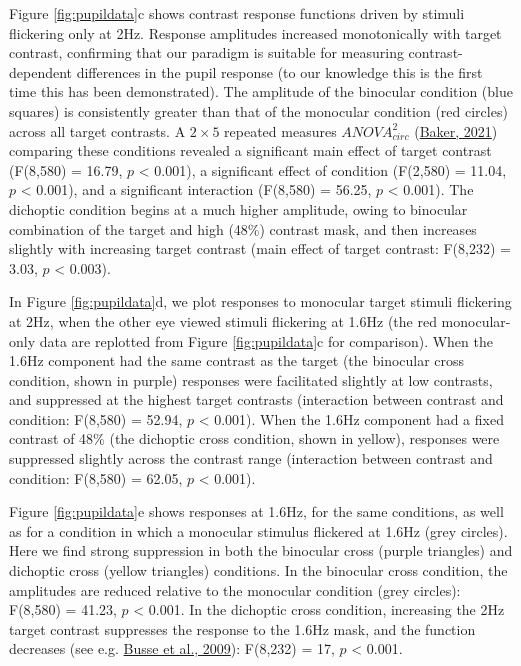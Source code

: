 \documentclass[
]{article}
\begin{document}
Figure \ref{fig:pupildata}c shows contrast response functions driven by stimuli flickering only at 2Hz. Response amplitudes increased monotonically with target contrast, confirming that our paradigm is suitable for measuring contrast-dependent differences in the pupil response (to our knowledge this is the first time this has been demonstrated). The amplitude of the binocular condition (blue squares) is consistently greater than that of the monocular condition (red circles) across all target contrasts. A \(2\times5\) repeated measures \(ANOVA^2_{circ}\) (\protect\hyperlink{ref-Baker2021}{Baker, 2021}) comparing these conditions revealed a significant main effect of target contrast (F(8,580) = 16.79, \(p\) \textless{} 0.001), a significant effect of condition (F(2,580) = 11.04, \(p\) \textless{} 0.001), and a significant interaction (F(8,580) = 56.25, \(p\) \textless{} 0.001). The dichoptic condition begins at a much higher amplitude, owing to binocular combination of the target and high (48\%) contrast mask, and then increases slightly with increasing target contrast (main effect of target contrast: F(8,232) = 3.03, \(p\) \textless{} 0.003).

In Figure \ref{fig:pupildata}d, we plot responses to monocular target stimuli flickering at 2Hz, when the other eye viewed stimuli flickering at 1.6Hz (the red monocular-only data are replotted from Figure \ref{fig:pupildata}c for comparison). When the 1.6Hz component had the same contrast as the target (the binocular cross condition, shown in purple) responses were facilitated slightly at low contrasts, and suppressed at the highest target contrasts (interaction between contrast and condition: F(8,580) = 52.94, \(p\) \textless{} 0.001). When the 1.6Hz component had a fixed contrast of 48\% (the dichoptic cross condition, shown in yellow), responses were suppressed slightly across the contrast range (interaction between contrast and condition: F(8,580) = 62.05, \(p\) \textless{} 0.001).

Figure \ref{fig:pupildata}e shows responses at 1.6Hz, for the same conditions, as well as for a condition in which a monocular stimulus flickered at 1.6Hz (grey circles). Here we find strong suppression in both the binocular cross (purple triangles) and dichoptic cross (yellow triangles) conditions. In the binocular cross condition, the amplitudes are reduced relative to the monocular condition (grey circles): F(8,580) = 41.23, \(p\) \textless{} 0.001. In the dichoptic cross condition, increasing the 2Hz target contrast suppresses the response to the 1.6Hz mask, and the function decreases (see e.g. \protect\hyperlink{ref-Busse2009}{Busse et al., 2009}): F(8,232) = 17, \(p\) \textless{} 0.001.
\end{document}
